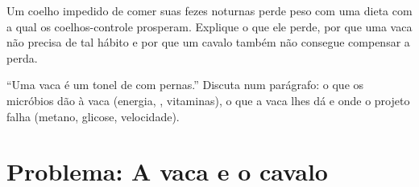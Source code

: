 \begin{exercise}[$\star\star\star$]\label{exo:b1:digestion-absorption:11}
Um coelho impedido de comer suas fezes noturnas perde peso com uma
dieta com a qual os coelhos-controle prosperam. Explique o que ele
perde, por que uma vaca não precisa de tal hábito e por que um cavalo
também não consegue compensar a perda.
\end{exercise}

\begin{exercise}[$\star\star\star$]\label{exo:b1:digestion-absorption:12}
``Uma vaca é um tonel de  com pernas.'' Discuta num
parágrafo: o que os micróbios dão à vaca (energia, ,
vitaminas), o que a vaca lhes dá e onde o projeto falha (metano,
glicose, velocidade).
\end{exercise}

\section{Problema: A vaca e o cavalo}

